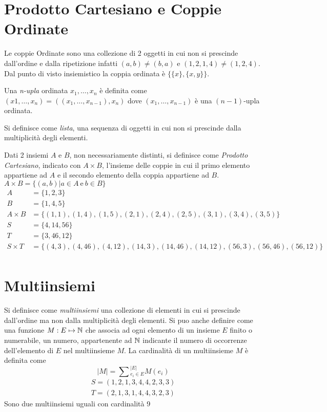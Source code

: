 \section{Prodotto Cartesiano e Coppie Ordinate}
Le coppie Ordinate sono una collezione di 2 oggetti in cui non si prescinde
dall'ordine e dalla ripetizione infatti $(a,b) \neq (b,a)$ e $(1,2,1,4) \neq (1,2,4)$.
Dal punto di visto insiemistico la coppia ordinata è $\{\{x\},\{x,y\}\}$.

Una \emph{n-upla} ordinata $x_1,\dots,x_n$ è definita come $(x1,\dots,x_n) = ( (x_1,\dots,x_{n-1}),x_n)$
dove $(x_1,\dots,x_{n-1})$ è una $(n-1)$-upla ordinata.

Si definisce come \emph{lista}, una sequenza di oggetti in cui non si prescinde
dalla multiplicità degli elementi.

Dati 2 insiemi $A$ e $B$, non necessariamente  distinti, si definisce come \textit{Prodotto Cartesiano},
indicato con $A \times B$, l'insieme delle coppie in cui il primo elemento appartiene ad $A$
e il secondo elemento della coppia appartiene ad $B$.\newline
$A \times B = \{(a,b) | a \in A \ \text{e} \ b \in B\} $
\begin{align*}
A & = \{1,2,3\} \\
B & = \{1,4,5\} \\
A \times B & = \{(1,1),(1,4),(1,5),(2,1),(2,4),(2,5),(3,1),(3,4),(3,5)\} \\
S & = \{ 4,14,56 \} \\
T & = \{ 3,46,12 \} \\
S \times T & = \{(4,3),(4,46),(4,12),(14,3),(14,46),(14,12),(56,3),(56,46),(56,12) \} \\
\end{align*}

\section{Multiinsiemi}
Si definisce come \emph{multiinsiemi} una collezione di elementi in cui si prescinde
dall'ordine ma non dalla multiplicità degli elementi.\newline
Si puo anche definire come una funzione $M:E \mapsto \mathbb{N}$ che associa ad ogni elemento
di un insieme $E$ finito o numerabile, un numero, appartenente ad $\mathbb{N}$ indicante
il numero di occorrenze dell'elemento di $E$ nel multiinsieme $M$.\newline
La cardinalità di un multiinsieme $M$ è definita come
\begin{equation*}
\displaystyle |M| = \sum{_{e_i \in E} ^ {|E|}} M(e_i)
\end{equation*}
\begin{align*}
S = (1,2,1,3,4,4,2,3,3) \\
T = (2,1,3,1,4,4,3,2,3)
\end{align*}
Sono due multiinsiemi uguali con cardinalità 9

